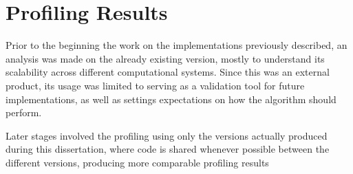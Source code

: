 \documentclass[main.tex]{subfiles}
\begin{document}
\chapter{Profiling Results} \label{chapter:results}

Prior to the beginning the work on the implementations previously described, an analysis was made on the already existing version, mostly to understand its scalability across different computational systems. Since this was an external product, its usage was limited to serving as a validation tool for future implementations, as well as settings expectations on how the algorithm should perform.

Later stages involved the profiling using only the versions actually produced during this dissertation, where code is shared whenever possible between the different versions, producing more comparable profiling results












\end{document}
